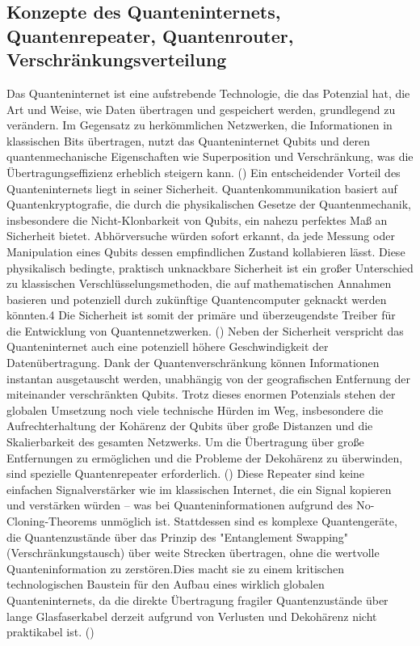 \subsection{Konzepte des Quanteninternets, Quantenrepeater, Quantenrouter, Verschränkungsverteilung}
Das Quanteninternet ist eine aufstrebende Technologie, die das Potenzial hat, die Art und Weise, wie Daten übertragen und gespeichert werden, grundlegend zu verändern. Im Gegensatz zu herkömmlichen Netzwerken, die Informationen in klassischen Bits übertragen, nutzt das Quanteninternet Qubits und deren quantenmechanische Eigenschaften wie Superposition und Verschränkung, was die Übertragungseffizienz erheblich steigern kann. (\cite{WasIstQuantencomputing})
Ein entscheidender Vorteil des Quanteninternets liegt in seiner Sicherheit. Quantenkommunikation basiert auf Quantenkryptografie, die durch die physikalischen Gesetze der Quantenmechanik, insbesondere die Nicht-Klonbarkeit von Qubits, ein nahezu perfektes Maß an Sicherheit bietet. Abhörversuche würden sofort erkannt, da jede Messung oder Manipulation eines Qubits dessen empfindlichen Zustand kollabieren lässt. Diese physikalisch bedingte, praktisch unknackbare Sicherheit ist ein großer Unterschied zu klassischen Verschlüsselungsmethoden, die auf mathematischen Annahmen basieren und potenziell durch zukünftige Quantencomputer geknackt werden könnten.4 Die Sicherheit ist somit der primäre und überzeugendste Treiber für die Entwicklung von Quantennetzwerken. (\cite{QuanteninternetZukunftTechnologie})
Neben der Sicherheit verspricht das Quanteninternet auch eine potenziell höhere Geschwindigkeit der Datenübertragung. Dank der Quantenverschränkung können Informationen instantan ausgetauscht werden, unabhängig von der geografischen Entfernung der miteinander verschränkten Qubits. Trotz dieses enormen Potenzials stehen der globalen Umsetzung noch viele technische Hürden im Weg, insbesondere die Aufrechterhaltung der Kohärenz der Qubits über große Distanzen und die Skalierbarkeit des gesamten Netzwerks.
Um die Übertragung über große Entfernungen zu ermöglichen und die Probleme der Dekohärenz zu überwinden, sind spezielle Quantenrepeater erforderlich.  (\cite{AuswirkungenQuanteninternetsAuf2025}) Diese Repeater sind keine einfachen Signalverstärker wie im klassischen Internet, die ein Signal kopieren und verstärken würden – was bei Quanteninformationen aufgrund des No-Cloning-Theorems unmöglich ist. Stattdessen sind es komplexe Quantengeräte, die Quantenzustände über das Prinzip des "Entanglement Swapping" (Verschränkungstausch) über weite Strecken übertragen, ohne die wertvolle Quanteninformation zu zerstören.Dies macht sie zu einem kritischen technologischen Baustein für den Aufbau eines wirklich globalen Quanteninternets, da die direkte Übertragung fragiler Quantenzustände über lange Glasfaserkabel derzeit aufgrund von Verlusten und Dekohärenz nicht praktikabel ist. (\cite{QuanteninternetZukunftTechnologie})
